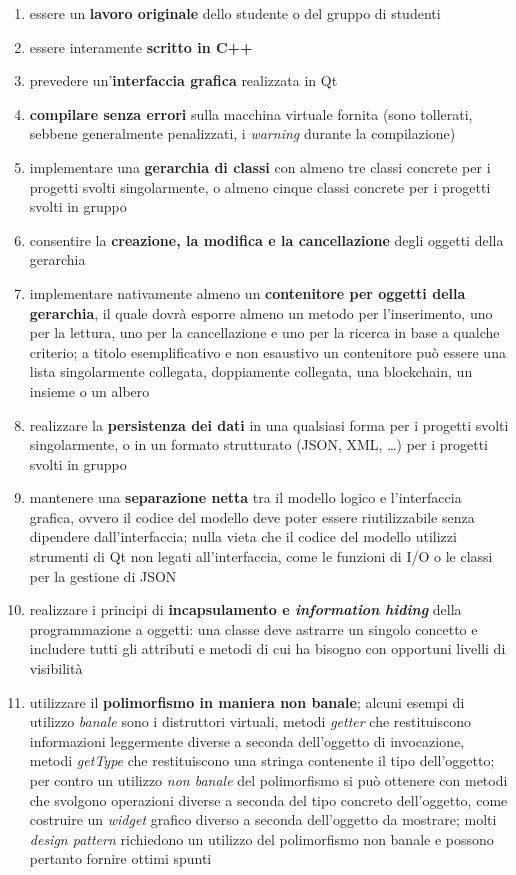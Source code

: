 \documentclass[10pt,a4paper,oneside]{article}
\begin{document}
\begin{enumerate}
 \item essere un \textbf{lavoro originale} dello studente o del gruppo di studenti
 \item essere interamente \textbf{scritto in C++}
 \item prevedere un'\textbf{interfaccia grafica} realizzata in Qt
 \item \textbf{compilare senza errori} sulla macchina virtuale fornita (sono tollerati, sebbene generalmente penalizzati, i \emph{warning} durante la compilazione)
 \item implementare una \textbf{gerarchia di classi} con almeno tre classi concrete per i progetti svolti singolarmente, o almeno cinque classi concrete per i progetti svolti in gruppo
 \item consentire la \textbf{creazione, la modifica e la cancellazione} degli oggetti della gerarchia
 \item implementare nativamente almeno un \textbf{contenitore per oggetti della gerarchia}, il quale dovrà esporre almeno un metodo per l'inserimento, uno per la lettura, uno per la cancellazione e uno per la ricerca in base a qualche criterio; a titolo esemplificativo e non esaustivo un contenitore può essere una lista singolarmente collegata, doppiamente collegata, una blockchain, un insieme o un albero
 \item realizzare la \textbf{persistenza dei dati} in una qualsiasi forma per i progetti svolti singolarmente, o in un formato strutturato (JSON, XML, \ldots) per i progetti svolti in gruppo
 \item mantenere una \textbf{separazione netta} tra il modello logico e l'interfaccia grafica, ovvero il codice del modello deve poter essere riutilizzabile senza dipendere dall'interfaccia; nulla vieta che il codice del modello utilizzi strumenti di Qt non legati all'interfaccia, come le funzioni di I/O o le classi per la gestione di JSON
 \item realizzare i principi di \textbf{incapsulamento e \emph{information hiding}} della programmazione a oggetti: una classe deve astrarre un singolo concetto e includere tutti gli attributi e metodi di cui ha bisogno con opportuni livelli di visibilità
 \item utilizzare il \textbf{polimorfismo in maniera non banale}; alcuni esempi di utilizzo \emph{banale} sono i distruttori virtuali, metodi \emph{getter} che restituiscono informazioni leggermente diverse a seconda dell'oggetto di invocazione, metodi \emph{getType} che restituiscono una stringa contenente il tipo dell'oggetto; per contro un utilizzo \emph{non banale} del polimorfismo si può ottenere con metodi che svolgono operazioni diverse a seconda del tipo concreto dell'oggetto, come costruire un \emph{widget} grafico diverso a seconda dell'oggetto da mostrare; molti \emph{design pattern} richiedono un utilizzo del polimorfismo non banale e possono pertanto fornire ottimi spunti

\end{enumerate}
\end{document}
